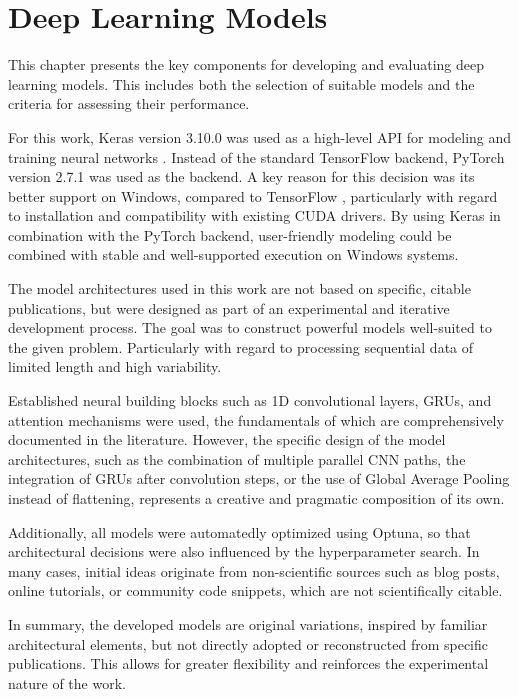 \section{Deep Learning Models}
\label{chap:dl-models}

This chapter presents the key components for developing and evaluating deep learning models.
This includes both the selection of suitable models and the criteria for assessing their performance.

For this work, Keras version 3.10.0 was used as a high-level API for modeling and training neural networks \cite{keras-home}.
Instead of the standard TensorFlow backend, PyTorch version 2.7.1 was used as the backend.
A key reason for this decision was its better support on Windows, compared to TensorFlow \cite{tf-windows}, particularly with regard to installation and compatibility with existing CUDA drivers.
By using Keras in combination with the PyTorch backend, user-friendly modeling could be combined with stable and well-supported execution on Windows systems.

The model architectures used in this work are not based on specific, citable publications, but were designed as part of an experimental and iterative development process.
The goal was to construct powerful models well-suited to the given problem.
Particularly with regard to processing sequential data of limited length and high variability.

Established neural building blocks such as 1D convolutional layers, GRUs, and attention mechanisms were used, the fundamentals of which are comprehensively documented in the literature.
However, the specific design of the model architectures, such as the combination of multiple parallel CNN paths, the integration of GRUs after convolution steps, or the use of Global Average Pooling instead of flattening, represents a creative and pragmatic composition of its own.

Additionally, all models were automatedly optimized using Optuna, so that architectural decisions were also influenced by the hyperparameter search.
In many cases, initial ideas originate from non-scientific sources such as blog posts, online tutorials, or community code snippets, which are not scientifically citable.

In summary, the developed models are original variations, inspired by familiar architectural elements, but not directly adopted or reconstructed from specific publications.
This allows for greater flexibility and reinforces the experimental nature of the work.

